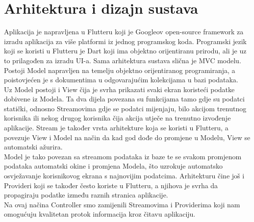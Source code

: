 \chapter{Arhitektura i dizajn sustava}

	
		
	Aplikacija je napravljena u Flutteru koji je Googleov open-source framework za izradu aplikacija za više platformi iz jednog programskog koda. 
	Programski jezik koji se koristi u Flutteru je Dart koji ima objektno orijentiranu prirodu, ali je uz to prilagođen za izradu UI-a. 
	Sama arhitektura sustava slična je MVC modelu. \\ 
	Postoji Model napravljen na temelju objektno orijentiranog programiranja, a poistovjećen je s dokumentima u odgovarajućim kolekcijama u bazi podataka. \\
	Uz Model postoji i View čija je svrha prikazati svaki ekran koristeći podatke dobivene iz Modela.
	Ta dva dijela povezana su funkcijama tamo gdje su podatci statički, odnosno Streamovima gdje se podatci mijenjaju, bilo akcijom trenutnog korisnika ili nekog drugog korisnika čija akcija utječe na trenutno izvođenje aplikacije. 
	Stream je također vrsta arhitekture koja se koristi u Flutteru, a povezuje View i Model na način da kad god dođe do promjene u Modelu, View se automatski ažurira. \\
	Model je tako povezan sa streamom podataka iz baze te se svakom promjenom podataka automatski okine i promjena Modela, što uzrokuje automatsko osvježavanje korisnikovog ekrana s najnovijim podatcima. 
	Arhitekturu čine još i Provideri koji se također često koriste u Flutteru, a njihova je svrha da propagiraju podatke između raznih stranica aplikacije. \\
	Na ovaj načina Controller smo zamijenili Streamovima i Providerima koji nam omogućuju kvalitetan protok informacija kroz čitavu aplikaciju.
		

